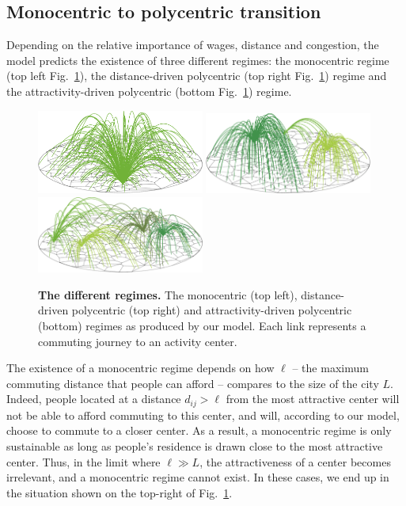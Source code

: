 \subsection{Monocentric to polycentric transition}
\label{sub:monocentric_to_polycentric_transition}

Depending on the relative importance of wages, distance and congestion, the
model predicts the existence of three different regimes: the monocentric regime
(top left Fig.~\ref{fig:model_results}), the distance-driven polycentric (top
right Fig.~\ref{fig:model_results}) regime and the attractivity-driven
polycentric (bottom Fig.~\ref{fig:model_results}) regime.\\


\begin{figure}
    \centering
    \includegraphics[width=0.49\textwidth]{gfx/chapter-monocentric/1.pdf}
    \includegraphics[width=0.49\textwidth]{gfx/chapter-monocentric/2.pdf}
    \includegraphics[width=0.49\textwidth]{gfx/chapter-monocentric/3.pdf}
    \caption{{\bf The different regimes.} The monocentric (top left), distance-driven polycentric (top right)
      and attractivity-driven polycentric (bottom) regimes as produced by
      our model. Each link represents a commuting journey to an activity center. \label{fig:model_results}}
\end{figure}

The existence of a monocentric regime depends on how $\ell$ -- the maximum
commuting distance that people can afford -- compares to the size of the city
$L$. Indeed, people located at a distance $d_{ij} > \ell$ from the most
attractive center will not be able to afford commuting to this center, and will,
according to our model, choose to commute to a closer center.  As a result, a
monocentric regime is only sustainable as long as people's residence is drawn
close to the most attractive center. Thus, in the limit where $\ell \gg L$, the
attractiveness of a center becomes irrelevant, and a monocentric regime cannot
exist. In these cases, we end up in the situation shown on the top-right of
Fig.~\ref{fig:model_results}.\\


